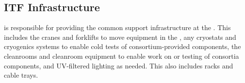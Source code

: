 \subsection{ITF Infrastructure}

 is responsible for providing the common support
infrastructure at the . This includes the cranes and
forklifts to move equipment in the , %
any
cryostats and cryogenics systems to enable cold tests of consortium-provided 
components, %
the cleanrooms and cleanroom equipment
to enable work on or testing of consortia components, and UV-filtered
lighting as needed. This also includes racks and cable trays.
